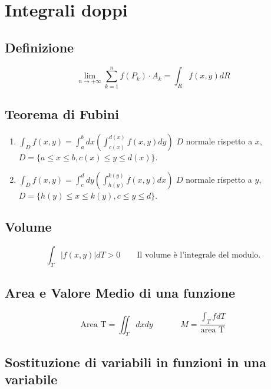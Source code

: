 \documentclass[10pt,a4paper,fleqn]{article}
\begin{document}
	\section{Integrali doppi}

	\subsection{Definizione}

	\begin{equation}
	\lim_{n \to +\infty} \sum_{k=1}^{n}f(P_k)\cdot A_k=\int_R f(x,y)dR
	\end{equation}

	\subsection{Teorema di Fubini}

	\begin{enumerate}[label=(\Alph*)]
	\item $\int_D f(x,y) = \int_a^b dx\left( \int_{c(x)}^{d(x)} f(x,y)dy\right)$ $D$ normale rispetto a $x$, $D=\{ a\leq x \leq b, c(x) \leq y \leq d(x)\} $.
	\item $\int_D f(x,y) = \int_c^d dy\left( \int_{h(y)}^{k(y)} f(x,y)dx\right)$ $D$ normale rispetto a $y$, $D=\{ h(y)\leq x \leq k(y), c \leq y \leq d\} $.
	\end{enumerate}

	\subsection{Volume}

	\begin{equation}
	\int_T \Bigr|f(x,y)\Bigr|dT > 0 \qquad \text{Il volume è l'integrale del modulo.}
	\end{equation}

	\subsection{Area e Valore Medio di una funzione}

	\begin{equation}
	\text{Area T} = \iint_T dxdy
	\hspace{40pt}
	M=\frac{\int_T fdT}{\text{area T}}
	\end{equation}

	\subsection{Sostituzione di variabili in funzioni in una variabile}
\end{document}
